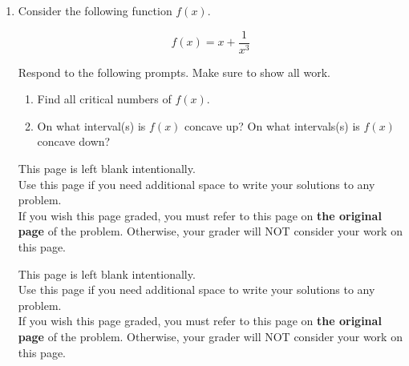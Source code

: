 \documentclass[11pt]{article}
\begin{document}
\begin{enumerate}
\begin{enumerate}
\item $\dfrac{(x^3 - x^2 +1)\ln(x)}{x}$

\vfill

\item $e^{3x}\left(x^4+3x\right)^7$

\vfill 
\end{enumerate}



\newpage


\item Consider the following function $f(x)$.

\[f(x)=x + \frac{1}{x^3}\]

Respond to the following prompts. Make sure to show all work.

\begin{enumerate}
    \item Find all critical numbers of $f(x)$.

    \vspace{6cm}

    \item On what interval(s) is $f(x)$ concave up? On what intervals(s) is $f(x)$ concave down?

    \vspace{6cm}

\end{enumerate}



\newpage

This page is left blank intentionally.\\

Use this page if you need additional space to write your solutions to any problem. \\

If you wish this page graded, you must refer to this page on \textbf{the original page} of the problem. Otherwise, your grader will NOT consider your work on this page.

\newpage

This page is left blank intentionally.\\

Use this page if you need additional space to write your solutions to any problem. \\

If you wish this page graded, you must refer to this page on \textbf{the original page} of the problem. Otherwise, your grader will NOT consider your work on this page.

\end{enumerate}
\end{document}
